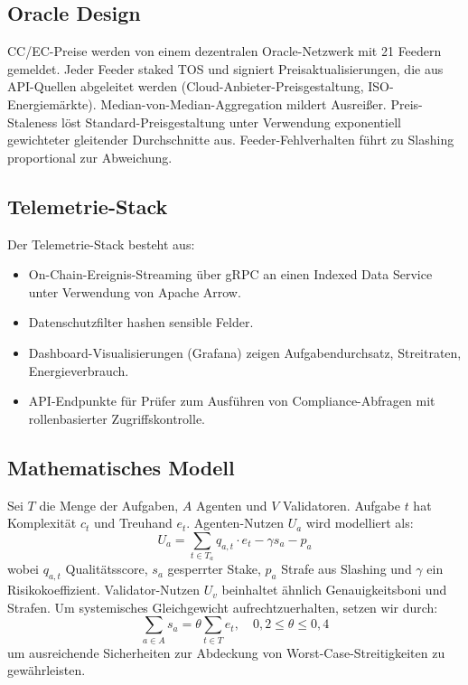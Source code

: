 \documentclass[11pt]{article}
\begin{document}
\subsection{Oracle Design}
CC/EC-Preise werden von einem dezentralen Oracle-Netzwerk mit 21 Feedern gemeldet. Jeder Feeder staked TOS und signiert Preisaktualisierungen, die aus API-Quellen abgeleitet werden (Cloud-Anbieter-Preisgestaltung, ISO-Energiemärkte). Median-von-Median-Aggregation mildert Ausreißer. Preis-Staleness löst Standard-Preisgestaltung unter Verwendung exponentiell gewichteter gleitender Durchschnitte aus. Feeder-Fehlverhalten führt zu Slashing proportional zur Abweichung.

\subsection{Telemetrie-Stack}
Der Telemetrie-Stack besteht aus:
\begin{itemize}[noitemsep]
  \item On-Chain-Ereignis-Streaming über gRPC an einen Indexed Data Service unter Verwendung von Apache Arrow.
  \item Datenschutzfilter hashen sensible Felder.
  \item Dashboard-Visualisierungen (Grafana) zeigen Aufgabendurchsatz, Streitraten, Energieverbrauch.
  \item API-Endpunkte für Prüfer zum Ausführen von Compliance-Abfragen mit rollenbasierter Zugriffskontrolle.
\end{itemize}

\subsection{Mathematisches Modell}
Sei $T$ die Menge der Aufgaben, $A$ Agenten und $V$ Validatoren. Aufgabe $t$ hat Komplexität $c_t$ und Treuhand $e_t$. Agenten-Nutzen $U_a$ wird modelliert als:
\begin{equation}
U_a = \sum_{t \in T_a} q_{a,t}\cdot e_t - \gamma s_a - p_a\label{eq:agent-utility}
\end{equation}
wobei $q_{a,t}$ Qualitätsscore, $s_a$ gesperrter Stake, $p_a$ Strafe aus Slashing und $\gamma$ ein Risikokoeffizient. Validator-Nutzen $U_v$ beinhaltet ähnlich Genauigkeitsboni und Strafen. Um systemisches Gleichgewicht aufrechtzuerhalten, setzen wir durch:
\begin{equation}
\sum_{a \in A} s_a = \theta \sum_{t \in T} e_t,\quad 0,2 \leq \theta \leq 0,4
\end{equation}
um ausreichende Sicherheiten zur Abdeckung von Worst-Case-Streitigkeiten zu gewährleisten.
\end{document}
